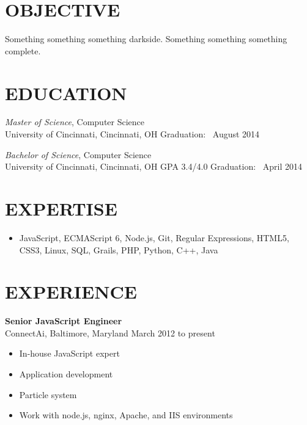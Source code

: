 \documentclass[11pt, line]{res}
\begin{document}
	\address{8228 Melrose Ln\\ Maineville, OH 45039\\ 513-259-0656\\ ross@rhadden.com}

	\begin{resume}
		\section{OBJECTIVE}
			Something something something darkside.  Something something something complete.

		\section{EDUCATION}
			\textit{Master of Science},
				Computer Science \\
				University of Cincinnati, Cincinnati, OH
				\hfill
				Graduation: \ August 2014

			\textit{Bachelor of Science},
				Computer Science \\
				University of Cincinnati, Cincinnati, OH
				\hspace{16pt}
				GPA 3.4/4.0
				\hfill
				Graduation: \ April 2014

		\section{EXPERTISE}
			\begin{itemize}[leftmargin=0pt]
				\item[]
					JavaScript,
					ECMAScript 6,
					Node.js,
					Git,
					Regular Expressions,
					HTML5,
					CSS3,
					Linux,
					SQL,
					Grails,
					PHP,
					Python,
					C++,
					Java
			\end{itemize}

		\section{EXPERIENCE}
				\textbf{Senior JavaScript Engineer} \\
				ConnectAi,\; Baltimore, Maryland
				\hfill March 2012 to present \

				\begin{itemize}
					\item In-house JavaScript expert
					\item Application development
					\item Particle system
					\item Work with node.js, nginx, Apache, and IIS environments
				\end{itemize}


\end{resume}
\end{document}
